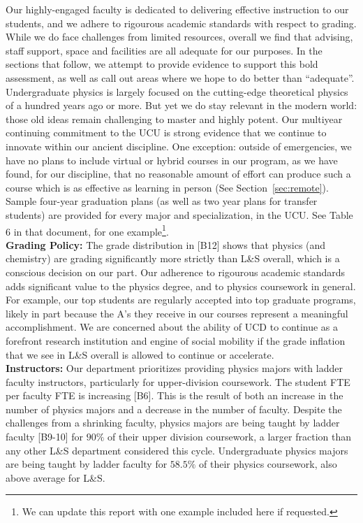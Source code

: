 \documentclass[12pt]{article}
\begin{document}
\noindent
Our highly-engaged faculty is dedicated to delivering effective
instruction to our students, and we adhere to rigourous academic
standards with respect to grading.  While we do face challenges from
limited resources, overall we find that advising, staff support, space
and facilities are all adequate for our purposes.  In the sections
that follow, we attempt to provide evidence to support this bold
assessment, as well as call out areas where we hope to do better than
``adequate''.  Undergraduate physics is largely focused on the
cutting-edge theoretical physics of a hundred years ago or more. But
yet we do stay relevant in the modern world: those old ideas remain
challenging to master and highly potent.  Our multiyear continuing
commitment to the UCU is strong evidence that we continue to innovate
within our ancient discipline.  One exception: outside of emergencies,
we have no plans to include virtual or hybrid courses in our program,
as we have found, for our discipline, that no reasonable amount of
effort can produce such a course which is as effective as learning in
person (See Section~\ref{sec:remote}).  Sample four-year graduation
plans (as well as two year plans for transfer students) are provided
for every major and specialization, in the UCU.  See Table 6 in that
document, for one example\footnote{We can update this report with one
  example included here if requested.}.\\[3pt]

\noindent
{\bf Grading Policy:} The grade distribution in [B12] shows that
physics (and chemistry) are grading significantly more strictly than
L\&S overall, which is a conscious decision on our part.  Our
adherence to rigourous academic standards adds significant value to
the physics degree, and to physics coursework in general.  For
example, our top students are regularly accepted into top graduate
programs, likely in part because the A's they receive in our courses
represent a meaningful accomplishment.  We are concerned about the
ability of UCD to continue as a forefront research institution and
engine of social mobility if the grade inflation that we see
in L\&S overall is allowed to continue or accelerate.\\[3pt]

\noindent
{\bf Instructors:} Our department prioritizes providing physics majors
with ladder faculty instructors, particularly for upper-division
coursework.  The student FTE per faculty FTE is increasing [B6].  This
is the result of both an increase in the number of physics majors and
a decrease in the number of faculty.  Despite the challenges from a
shrinking faculty, physics majors are being taught by ladder faculty
[B9-10] for $90\%$ of their upper division coursework, a larger
fraction than any other L\&S department considered this cycle.
Undergraduate physics majors are being taught by ladder faculty for
$58.5\%$ of their physics coursework, also above average for L\&S.
\end{document}
